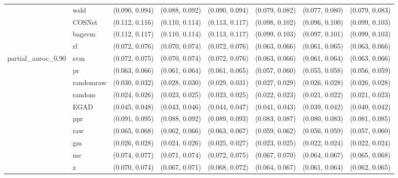 \begin{table}[H]
{\begin{tabular}{llllllll}
 & wsld & (0.090, 0.094) & (0.088, 0.092) & (0.090, 0.094) & (0.079, 0.082) & (0.077, 0.080) & (0.079, 0.083)\\

 & COSNet & (0.112, 0.116) & (0.110, 0.114) & (0.113, 0.117) & (0.098, 0.102) & (0.096, 0.100) & (0.099, 0.103)\\

 & bagsvm & (0.112, 0.117) & (0.110, 0.114) & (0.113, 0.117) & (0.099, 0.103) & (0.097, 0.101) & (0.099, 0.103)\\

 & rf & (0.072, 0.076) & (0.070, 0.074) & (0.072, 0.076) & (0.063, 0.066) & (0.061, 0.065) & (0.063, 0.066)\\

\multirow{-15}{*}{\raggedright\arraybackslash partial\_auroc\_0.90} & svm & (0.072, 0.075) & (0.070, 0.074) & (0.072, 0.076) & (0.063, 0.066) & (0.061, 0.064) & (0.063, 0.066)\\
\cmidrule{1-8}
 & pr & (0.063, 0.066) & (0.061, 0.064) & (0.061, 0.065) & (0.057, 0.060) & (0.055, 0.058) & (0.056, 0.059)\\

 & randomraw & (0.030, 0.032) & (0.028, 0.030) & (0.029, 0.031) & (0.027, 0.029) & (0.026, 0.028) & (0.026, 0.028)\\

 & random & (0.024, 0.026) & (0.023, 0.025) & (0.023, 0.025) & (0.022, 0.023) & (0.021, 0.022) & (0.021, 0.023)\\

 & EGAD & (0.045, 0.048) & (0.043, 0.046) & (0.044, 0.047) & (0.041, 0.043) & (0.039, 0.042) & (0.040, 0.042)\\

 & ppr & (0.091, 0.095) & (0.088, 0.092) & (0.089, 0.093) & (0.083, 0.087) & (0.080, 0.083) & (0.081, 0.085)\\

 & raw & (0.065, 0.068) & (0.062, 0.066) & (0.063, 0.067) & (0.059, 0.062) & (0.056, 0.059) & (0.057, 0.060)\\

 & gm & (0.026, 0.028) & (0.024, 0.026) & (0.025, 0.027) & (0.023, 0.025) & (0.022, 0.024) & (0.022, 0.024)\\

 & mc & (0.074, 0.077) & (0.071, 0.074) & (0.072, 0.075) & (0.067, 0.070) & (0.064, 0.067) & (0.065, 0.068)\\

 & z & (0.070, 0.074) & (0.067, 0.071) & (0.068, 0.072) & (0.064, 0.067) & (0.061, 0.064) & (0.062, 0.065)\\


\end{tabular}}
\end{table}
